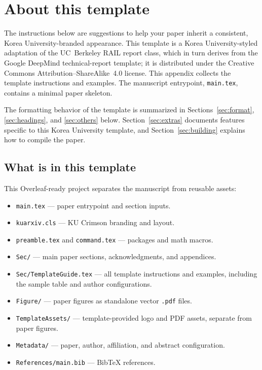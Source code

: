 \section{About this template}
\label{sec:about}

The instructions below are suggestions to help your paper inherit a
consistent, Korea University-branded appearance. This template is a Korea University-styled adaptation of
the UC~Berkeley RAIL report class, which in turn derives from the Google DeepMind
technical-report template; it is distributed under the Creative Commons
Attribution--ShareAlike~4.0 license. This appendix collects the template instructions and examples. The manuscript entrypoint, \verb+main.tex+, contains a minimal paper skeleton.

The formatting behavior of the template is summarized in
Sections~\ref{sec:format}, \ref{sec:headings}, and \ref{sec:others} below.
Section~\ref{sec:extras} documents features specific to this Korea University template, and
Section~\ref{sec:building} explains how to compile the paper.

\subsection{What is in this template}
\label{sec:files}

This Overleaf-ready project separates the manuscript from reusable assets:
\begin{itemize}
  \item \verb+main.tex+ --- paper entrypoint and section inputs.
  \item \verb+kuarxiv.cls+ --- KU Crimson branding and layout.
  \item \verb+preamble.tex+ and \verb+command.tex+ --- packages and math macros.
  \item \verb+Sec/+ --- main paper sections, acknowledgments, and appendices.
  \item \verb+Sec/TemplateGuide.tex+ --- all template instructions and examples, including the sample table and author configurations.
  \item \verb+Figure/+ --- paper figures as standalone vector \verb+.pdf+ files.
  \item \verb+TemplateAssets/+ --- template-provided logo and PDF assets, separate from paper figures.
  \item \verb+Metadata/+ --- paper, author, affiliation, and abstract configuration.
  \item \verb+References/main.bib+ --- BibTeX references.
\end{itemize}

